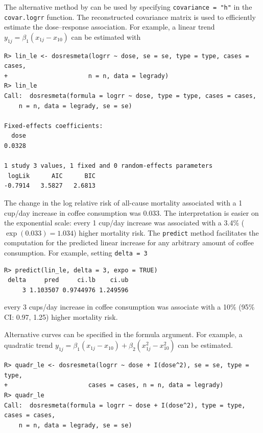 \documentclass[11pt,a4paper,twoside,openany]{book}\usepackage{knitr}
\begin{document}
{\noindent The alternative method by \cite{hamling2008facilitating} can be used by specifying \texttt{covariance = "h"} in the \texttt{covar.logrr} function. The reconstructed covariance matrix is used to efficiently estimate the dose--response association. For example, a linear trend $y_{1j} = \beta_1 (x_{1j} - x_{10})$ can be estimated with

\begin{knitrout}\footnotesize
{}\color{fgcolor}\begin{kframe}
\begin{verbatim}
R> lin_le <- dosresmeta(logrr ~ dose, se = se, type = type, cases = cases, 
+                      n = n, data = legrady)
R> lin_le
Call:  dosresmeta(formula = logrr ~ dose, type = type, cases = cases, 
    n = n, data = legrady, se = se)

Fixed-effects coefficients:
  dose  
0.0328  

1 study 3 values, 1 fixed and 0 random-effects parameters
 logLik      AIC      BIC  
-0.7914   3.5827   2.6813  
\end{verbatim}
\end{kframe}
\end{knitrout}


\noindent The change in the log relative risk of all-cause mortality associated with a 1 cup/day increase in coffee consumption was 0.033. The interpretation is easier on the exponential scale: every 1 cup/day increase was associated with a 3.4\%
($\exp(0.033) = 1.034$) higher mortality risk. 
The \texttt{predict} method facilitates the computation for the predicted linear increase for any arbitrary amount of coffee consumption. For example, setting \texttt{delta = 3}

\begin{knitrout}\footnotesize
{}\color{fgcolor}\begin{kframe}
\begin{verbatim}
R> predict(lin_le, delta = 3, expo = TRUE)
 delta     pred     ci.lb    ci.ub
     3 1.103507 0.9744976 1.249596
\end{verbatim}
\end{kframe}
\end{knitrout}


\noindent every 3 cups/day increase in coffee consumption was associate with a 10\% (95\% CI: 0.97, 1.25) higher mortality risk.

Alternative curves can be specified in the formula argument. For example, a quadratic trend $y_{1j} = \beta_1 (x_{1j} - x_{10}) + \beta_2 (x_{1j}^2 - x_{10}^2)$ can be estimated.
\begin{knitrout}\footnotesize
{}\color{fgcolor}\begin{kframe}
\begin{verbatim}
R> quadr_le <- dosresmeta(logrr ~ dose + I(dose^2), se = se, type = type,
+                      cases = cases, n = n, data = legrady)
R> quadr_le
Call:  dosresmeta(formula = logrr ~ dose + I(dose^2), type = type, cases = cases, 
    n = n, data = legrady, se = se)


\end{verbatim}
\end{kframe}
\end{knitrout}}
\end{document}
